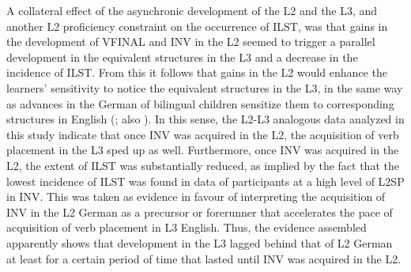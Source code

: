 \documentclass[output=paper,modfonts,nonflat, newtxmath]{langsci/langscibook}
\begin{document}
A collateral effect of the asynchronic development of the L2 and the L3, and another L2 proficiency constraint on the occurrence of ILST, was that gains in the development of VFINAL and INV in the L2 seemed to trigger a parallel development in the equivalent structures in the L3 and a decrease in the incidence of ILST. From this it follows that gains in the L2 would enhance the learners’ sensitivity to notice the equivalent structures in the L3, in the same way as advances in the German of bilingual children sensitize them to corresponding structures in English (\citealt[29]{TracyGawlitzek-Maiwald2005}; also \citealt{Gawlitzek-Maiwald2001}). In this sense, the L2-L3 analogous data analyzed in this study indicate that once INV was acquired in the L2, the acquisition of verb placement in the L3 sped up as well. Furthermore, once INV was acquired in the L2, the extent of ILST was substantially reduced, as implied by the fact that the lowest incidence of ILST was found in data of participants at a high level of L2SP in INV. This was taken as evidence in favour of interpreting the acquisition of INV in the L2 German as a precursor or forerunner that accelerates the pace of acquisition of verb placement in L3 English. Thus, the evidence assembled apparently shows that development in the L3 lagged behind that of L2 German at least for a certain period of time that lasted until INV was acquired in the L2.
\end{document}
